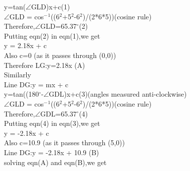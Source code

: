 \documentclass[a4paper,12pt]{article}
\begin{document}
\hspace*{0.5cm}y=tan($\angle$GLD)x+c\hspace*{2cm}(1) \\

$\angle$GLD = cos$^-$$^1$((6$^2$+5$^2$-6$^2$)/(2*6*5))\hspace*{2cm}(cosine rule)\\

Therefore,$\angle$GLD=65.37$^{\circ}$\hspace*{2cm}(2)\\

Putting eqn(2) in eqn(1),we get\\

y = 2.18x + c\\

Also c=0       \hspace{3cm} (as it passes through (0,0))\\

Therefore LG:y=2.18x  \hspace*{2cm}(A)\\

Similarly\\


Line DG:y = mx + c\\

\hspace*{0.5cm}y=tan((180$^{\circ}$-$\angle$GDL)x+c\hspace*{2cm}(3)(angles measured anti-clockwise)\\

$\angle$GLD = cos$^-$$^1$((6$^2$+5$^2$-6$^2$)/(2*6*5))\hspace*{2cm}(cosine rule)\\

Therefore,$\angle$GDL=65.37$^{\circ}$\hspace*{2cm}(4)\\

Putting eqn(4) in eqn(3),we get\\

y = -2.18x + c\\

Also c=10.9       \hspace{3cm} (as it passes through (5,0))\\

Line DG:y = -2.18x + 10.9 \hspace*{2cm}(B)\\

solving  eqn(A) and eqn(B),we get\\
\end{document}
